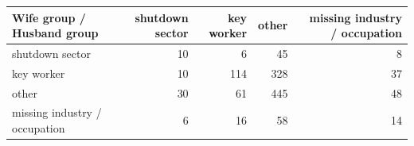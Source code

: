 
\begin{tabular}{lrrrr}
\toprule
Wife group / Husband group & shutdown sector & key worker & other & missing industry / occupation\\
\midrule
shutdown sector & 10 & 6 & 45 & 8\\
key worker & 10 & 114 & 328 & 37\\
other & 30 & 61 & 445 & 48\\
missing industry / occupation & 6 & 16 & 58 & 14\\
\bottomrule
\end{tabular}
